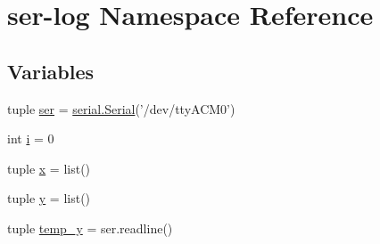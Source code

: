 \hypertarget{namespaceser-log}{\section{ser-\/log Namespace Reference}
\label{namespaceser-log}
}
\subsection*{Variables}
\begin{DoxyCompactItemize}
\item 
tuple \hyperlink{namespaceser-log_ae5e2c2855fe8c235874474c5277745ac}{ser} = \hyperlink{HardwareSerial_8h_a7b8c4a195c58f9eb8750e94955c5aa4b}{serial.\-Serial}('/dev/tty\-A\-C\-M0')
\item 
int \hyperlink{namespaceser-log_a07a12eb5896dee0953b2f34bf4e3e0d8}{i} = 0
\item 
tuple \hyperlink{namespaceser-log_ad4c918427408ee85c0def9ccf3a8cdaa}{x} = list()
\item 
tuple \hyperlink{namespaceser-log_a6381ab980f595f0e94c91312cc3020c5}{y} = list()
\item 
tuple \hyperlink{namespaceser-log_af746ba3a68039d15d0a46e905dc990d2}{temp\-\_\-y} = ser.\-readline()
\end{DoxyCompactItemize}


